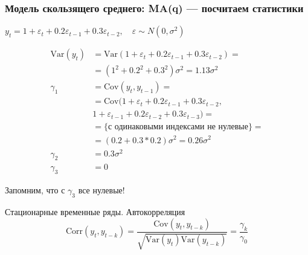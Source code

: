 \documentclass[fullscreen=true, bookmarks=true, hyperref={pdfencoding=unicode}]{beamer}
\begin{document}
\begin{frame}
  \frametitle{Модель скользящего среднего: MA(q) — посчитаем статистики}

  $y_t = 1 + \varepsilon_t + 0.2\varepsilon_{t-1} + 0.3\varepsilon_{t-2}, \quad \varepsilon \sim N(0, \sigma^2) $

  \begin{align*}
    \text{Var}(y_t) &= \text{Var}(1 + \varepsilon_t + 0.2\varepsilon_{t-1} + 0.3\varepsilon_{t-2}) = \\
      &= (1^2 + 0.2^2 + 0.3^2) \sigma^2 = 1.13\sigma^2 \\
    \gamma_1 &= \text{Cov}(y_t, y_{t-1}) = \\
     &=  \text{Cov}(1 + \varepsilon_t + 0.2\varepsilon_{t-1} + 0.3\varepsilon_{t-2},\\
     & 1 + \varepsilon_{t-1} + 0.2\varepsilon_{t-2} + 0.3\varepsilon_{t-3}) = \\
     &= \text{\{с одинаковыми индексами не нулевые\}} = \\
     &= (0.2 + 0.3*0.2) \sigma^2 = 0.26\sigma^2 \\
    \gamma_2 &= 0.3\sigma^2 \\
    \gamma_3 &= 0
  \end{align*}

  Запомним, что с $\gamma_3$ все нулевые!
\end{frame}


\begin{frame}
   \begin{block}{Стационарные временные ряды. Автокорреляция}
     $$ \text{Corr}(y_t, y_{t-k}) = \frac{\text{Cov}(y_t, y_{t-k})}{\sqrt{\text{Var}(y_t)\text{Var}(y_{t-k})}} = \frac{\gamma_k}{\gamma_0}$$
   \end{block}

\end{frame}
\end{document}
